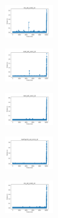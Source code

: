 \vspace*{\fill}
\newpage
\vspace*{\fill}

\begin{figure}[H]    
    \centering
    \begin{subfigure}
        \centering
        \includegraphics[width=0.234\textwidth]{img/HS-LS/iris_set_const_10_949004259_time.png}
    \end{subfigure}
    \hfill
    \begin{subfigure}
        \centering
        \includegraphics[width=0.234\textwidth]{img/HS-LS/ecoli_set_const_10_949004259_time.png}
    \end{subfigure}
    \hfill
    \begin{subfigure}
        \centering
        \includegraphics[width=0.234\textwidth]{img/HS-LS/rand_set_const_10_949004259_time.png}
    \end{subfigure}
    \hfill
    \begin{subfigure}
        \centering
        \includegraphics[width=0.234\textwidth]{img/HS-LS/newthyroid_set_const_10_949004259_time.png}
    \end{subfigure}
    \hfill
    \begin{subfigure}
        \centering
        \includegraphics[width=0.234\textwidth]{img/HS-LS/iris_set_const_10_589741062_time.png}

\end{subfigure}
\end{figure}
